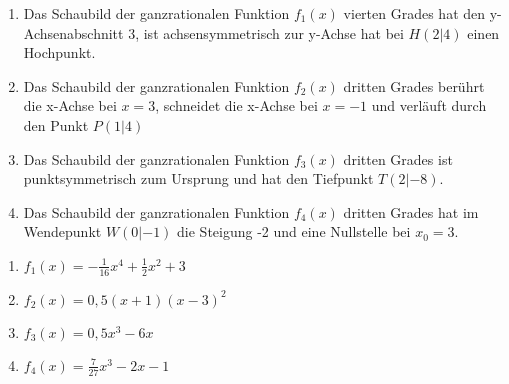 \begin{Exercise}[title={\raggedright Bestimme jeweils die Funktionsgleichung.}, label=fktbestimmenA1]
	\begin{enumerate}[label=\alph*)]
		\item Das Schaubild der ganzrationalen Funktion \(f_1(x)\) vierten Grades hat den y-Achsenabschnitt 3, ist achsensymmetrisch zur y-Achse hat bei \(H(2|4)\) einen Hochpunkt.
		\item Das Schaubild der ganzrationalen Funktion \(f_2(x)\) dritten Grades berührt die x-Achse bei \(x=3\), schneidet die x-Achse bei \(x=-1\) und verläuft durch den Punkt \(P(1|4)\)
		\item Das Schaubild der ganzrationalen Funktion \(f_3(x)\) dritten Grades ist punktsymmetrisch zum Ursprung und hat den Tiefpunkt \(T(2|-8)\).
		\item Das Schaubild der ganzrationalen Funktion \(f_4(x)\) dritten Grades hat im Wendepunkt \newline\(W(0|-1)\) die Steigung -2 und eine Nullstelle bei \(x_0=3\).
	\end{enumerate}
\end{Exercise}
\begin{Answer}[ref=fktbestimmenA1]
	\begin{enumerate}[label=\alph*)]
		\item \(f_1(x)=-\frac{1}{16}x^4+\frac{1}{2}x^2+3\)
		\item \(f_2(x)=0,5(x+1)(x-3)^2\)
		\item \(f_3(x)=0,5x^3-6x\)
		\item \(f_4(x)=\frac{7}{27}x^3-2x-1\)
	\end{enumerate}
\end{Answer}

